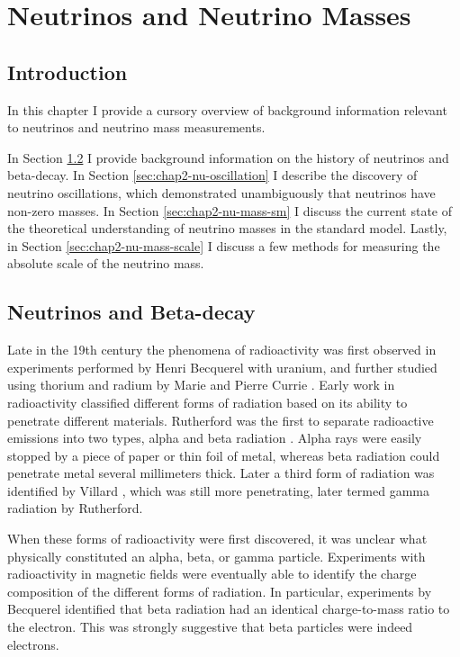 
\chapter{Neutrinos and Neutrino Masses}

\section{Introduction}

In this chapter I provide a cursory overview of background information relevant to neutrinos and neutrino mass measurements. 

In Section \ref{sec:chap2-nu-history} I provide background information on the history of neutrinos and beta-decay. In Section \ref{sec:chap2-nu-oscillation} I describe the discovery of neutrino oscillations, which demonstrated unambiguously that neutrinos have non-zero masses. In Section \ref{sec:chap2-nu-mass-sm} I discuss the current state of the theoretical understanding of neutrino masses in the standard model. Lastly, in Section \ref{sec:chap2-nu-mass-scale} I discuss a few methods for measuring the absolute scale of the neutrino mass.

\section{Neutrinos and Beta-decay}
\label{sec:chap2-nu-history}
Late in the 19th century the phenomena of radioactivity was first observed in experiments performed by Henri Becquerel with uranium, and further studied using thorium and radium by Marie and Pierre Currie \cite{nuclear_physics, curie}. Early work in radioactivity classified different forms of radiation based on its ability to penetrate different materials. Rutherford was the first to separate radioactive emissions into two types, alpha and beta radiation \cite{rutherford_rad_types}. Alpha rays were easily stopped by a piece of paper or thin foil of metal, whereas beta radiation could penetrate metal several millimeters thick. Later a third form of radiation was identified by Villard \cite{villard}, which was still more penetrating, later termed gamma radiation by Rutherford. 

When these forms of radioactivity were first discovered, it was unclear what physically constituted an alpha, beta, or gamma particle. Experiments with radioactivity in magnetic fields were eventually able to identify the charge composition of the different forms of radiation. In particular, experiments by Becquerel identified \cite{Becquerel_beta_electron} that beta radiation had an identical charge-to-mass ratio to the electron. This was strongly suggestive that beta particles were indeed electrons.


